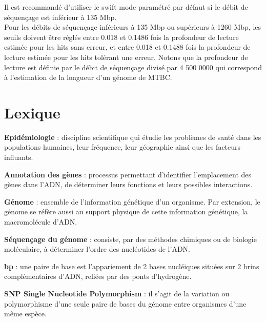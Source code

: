 \documentclass[twoside,a4paper,11pt,frenchb,openany]{report}
\begin{document}
Il est recommandé d'utiliser le swift mode paramétré par défaut si le débit de séquençage est inférieur à 135 Mbp.\\
Pour les débits de séquençage inférieurs à 135 Mbp ou supérieurs à 1260 Mbp, les seuils doivent être réglés entre 0.018 et 0.1486 fois la profondeur de lecture estimée pour les hits sans erreur, et entre 0.018 et 0.1488 fois la profondeur de lecture estimée pour les hits tolérant une erreur. Notons que la profondeur de lecture est définie par le débit de séquençage divisé par 4 500 0000 qui correspond à l'estimation de la longueur d'un génome de MTBC.























\section{Lexique}



\textbf{Epidémiologie} : discipline scientifique qui étudie les problèmes de santé dans les populations humaines, leur fréquence, leur géographie ainsi que les facteurs influants.

\textbf{Annotation des gènes} : processus permettant d'identifier l'emplacement des gènes dans l'ADN, de déterminer leurs fonctions et leurs possibles interactions.

\textbf{Génome} : ensemble de l'information génétique d'un organisme. Par extension, le génome se réfère aussi au support physique de cette information génétique, la macromolécule d'ADN.

\textbf{Séquençage du génome} : consiste, par des méthodes chimiques ou de biologie moléculaire, à déterminer l'ordre des nucléotides de l'ADN.

\textbf{bp} : une paire de base est l'appariement de 2 bases nucléiques situées sur 2 brins complémentaires d'ADN, reliées par des ponts d'hydrogène.

\textbf{SNP Single Nucleotide Polymorphism} : il s'agit de la variation ou polymorphisme d'une seule paire de bases du génome entre organismes d'une même espèce.
\end{document}
